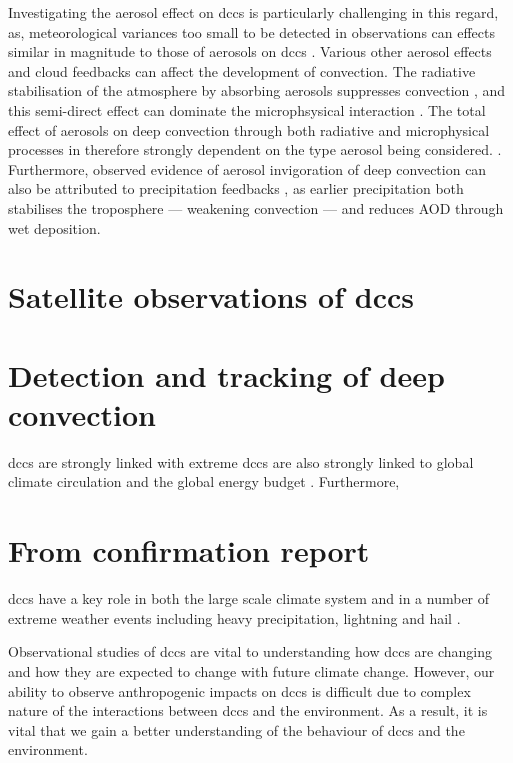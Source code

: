 Investigating the aerosol effect on \acrshort{dcc}s is particularly challenging in this regard, as, meteorological variances too small to be detected in observations can effects similar in magnitude to those of aerosols on \acrshort{dcc}s \citep{grabowski_can_2018}.
Various other aerosol effects and cloud feedbacks can affect the development of convection.
The radiative stabilisation of the atmosphere by absorbing aerosols suppresses convection \citep{koren_smoke_2008}, and this semi-direct effect can dominate the microphsysical interaction \citep{fan_effects_2008}.
The total effect of aerosols on deep convection through both radiative and microphysical processes in therefore strongly dependent on the type aerosol being considered. \citep{jiang_contrasting_2018}.
Furthermore, observed evidence of aerosol invigoration of deep convection can also be attributed to precipitation feedbacks \citep{varble_erroneous_2018}, as earlier precipitation both stabilises the troposphere --- weakening convection --- and reduces AOD through wet deposition. 

\section{Satellite observations of \acrshort{dcc}s}



\section{Detection and tracking of deep convection}





\acrshort{dcc}s are strongly linked with extreme  
\acrshort{dcc}s are also strongly linked to global climate circulation and the global energy budget \citep{houze_mesoscale_2004, fritsch_mesoscale_2001, johnson_mesoscale_2001}.
Furthermore, 

\section{From confirmation report}

\acrshort{dcc}s have a key role in both the large scale climate system and in a number of extreme weather events including heavy precipitation, lightning and hail \citep[e.g.][]{westra_future_2014, houze_chapter_2014, williams_radar_1992, bruning_theory_2013, punge_hail_2016, matsudo_severe_2011}.

Observational studies of \acrshort{dcc}s are vital to understanding how \acrshort{dcc}s are changing and how they are expected to change with future climate change.
However, our ability to observe anthropogenic impacts on \acrshort{dcc}s is difficult due to complex nature of the interactions between \acrshort{dcc}s and the environment.
As a result, it is vital that we gain a better understanding of the behaviour of \acrshort{dcc}s and the environment.








